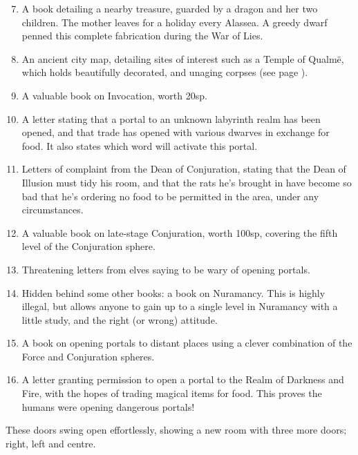 \begin{enumerate}

\setcounter{enumi}{6}
  \item
  A book detailing a nearby treasure, guarded by a dragon and her two children.
  The mother leaves for a holiday every Alassea.
  A greedy dwarf penned this complete fabrication during the War of Lies.%
  \item
  An ancient city map, detailing sites of interest such as a Temple of Qualm\"{e}, which holds beautifully decorated, and unaging corpses (see page \pageref{green_tower}).
  \item
  A valuable book on Invocation, worth 20sp.
  \item
  A letter stating that a portal to an unknown labyrinth realm has been opened, and that trade has opened with various dwarves in exchange for food.  It also states which word will activate this portal.
  \item
  Letters of complaint from the Dean of Conjuration, stating that the Dean of Illusion must tidy his room, and that the rats he's brought in have become so bad that he's ordering no food to be permitted in the area, under any circumstances.
  \item
  A valuable book on late-stage Conjuration, worth 100sp, covering the fifth level of the Conjuration sphere.
  \item
  Threatening letters from elves saying to be wary of opening portals.
  \item
  Hidden behind some other books: a book on Nuramancy.  This is highly illegal, but allows anyone to gain up to a single level in Nuramancy with a little study, and the right (or wrong) attitude.
  \item
  A book on opening portals to distant places using a clever combination of the Force and Conjuration spheres.
  \item
  A letter granting permission to open a portal to the Realm of Darkness and Fire, with the hopes of trading magical items for food.
  This proves the humans were opening dangerous portals!

\end{enumerate}


\begin{boxtext}
  These doors swing open effortlessly, showing a new room with three more doors; right, left and centre.

\end{boxtext}

